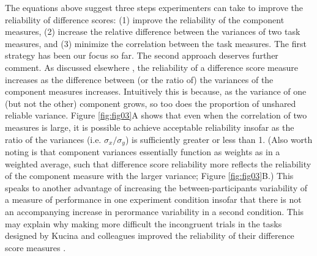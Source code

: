 \documentclass[a4paper,12pt]{article}
\begin{document}
The equations above suggest three steps experimenters can take to improve the reliability of difference scores: (1) improve the reliability of the component measures, (2) increase the relative difference between the variances of two task measures, and (3) minimize the correlation between the task measures. The first strategy has been our focus so far. The second approach deserves further comment. As discussed elsewhere \cite{chiou1996reliability}, the reliability of a difference score measure increases as the difference between (or the ratio of) the variances of the component measures increases. Intuitively this is because, as the variance of one (but not the other) component grows, so too does the proportion of unshared reliable variance. Figure \ref{fig:fig03}A shows that even when the correlation of two measures is large, it is possible to achieve acceptable reliability insofar as the ratio of the variances (i.e. $\sigma_x / \sigma_y$) is sufficiently greater or less than 1. (Also worth noting is that component variances essentially function as weights as in a weighted average, such that difference score reliability more reflects the reliability of the component measure with the larger variance; Figure \ref{fig:fig03}B.) This speaks to another advantage of increasing the between-participants variability of a measure of performance in one experiment condition insofar that there is not an accompanying increase in perormance variability in a second condition. This may explain why making more difficult the incongruent trials in the tasks designed by Kucina and colleagues improved the reliability of their difference score measures \cite{kucina2022solution}.
\end{document}
